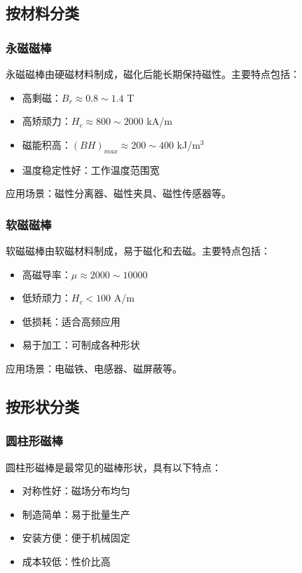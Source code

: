 \documentclass[12pt,UTF8]{ctexbook}
\begin{document}
\subsection{按材料分类}

\subsubsection{永磁磁棒}

永磁磁棒由硬磁材料制成，磁化后能长期保持磁性。主要特点包括：

\begin{itemize}[leftmargin=2cm]
    \item 高剩磁：$B_r \approx 0.8 \sim 1.4$ T
    \item 高矫顽力：$H_c \approx 800 \sim 2000$ kA/m
    \item 磁能积高：$(BH)_{max} \approx 200 \sim 400$ kJ/m$^3$
    \item 温度稳定性好：工作温度范围宽
\end{itemize}

应用场景：磁性分离器、磁性夹具、磁性传感器等。

\subsubsection{软磁磁棒}

软磁磁棒由软磁材料制成，易于磁化和去磁。主要特点包括：

\begin{itemize}[leftmargin=2cm]
    \item 高磁导率：$\mu \approx 2000 \sim 10000$
    \item 低矫顽力：$H_c < 100$ A/m
    \item 低损耗：适合高频应用
    \item 易于加工：可制成各种形状
\end{itemize}

应用场景：电磁铁、电感器、磁屏蔽等。

\subsection{按形状分类}

\subsubsection{圆柱形磁棒}

圆柱形磁棒是最常见的磁棒形状，具有以下特点：

\begin{itemize}[leftmargin=2cm]
    \item 对称性好：磁场分布均匀
    \item 制造简单：易于批量生产
    \item 安装方便：便于机械固定
    \item 成本较低：性价比高
\end{itemize}
\end{document}
